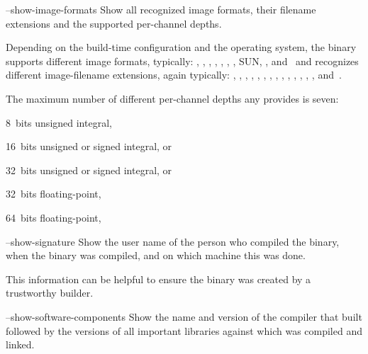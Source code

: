 \begin{codelist}
\begin{exemplar}
    \caption[Sample  configuration.]%
            {\label{ex:opencl-config}%
              A sample  configuration as detected by \App.}
  \end{exemplar}


  \label{opt:show-image-formats}%
\item[--show-image-formats]\itemend
  Show all recognized image formats, their filename extensions and the supported per-channel
  depths.

  Depending on the build-time configuration and the operating system, the binary supports
  different image formats, typically: , , ,
  , , , , SUN, ,
  and~ and recognizes different image-filename extensions, again typically:
  , , , , ,
  , , , , ,
  , , , , and~.

  The maximum number of different per-channel depths any \appcmd{} provides is seven:
  \begin{compactitemize}
  \item 8~bits unsigned integral, 
  \item 16~bits unsigned or signed integral,  or 
  \item 32~bits unsigned or signed integral,  or 
  \item 32~bits floating-point, 
  \item 64~bits floating-point, 
  \end{compactitemize}


  \label{opt:show-signature}%
\item[--show-signature]\itemend
  Show the user name of the person who compiled the binary, when the binary was compiled, and on
  which machine this was done.

  This information can be helpful to ensure the binary was created by a trustworthy builder.


  \label{opt:show-software-components}%
\item[--show-software-components]\itemend
  Show the name and version of the compiler that built \App{} followed by the versions of all
  important libraries against which \App{} was compiled and linked.


\end{codelist}
